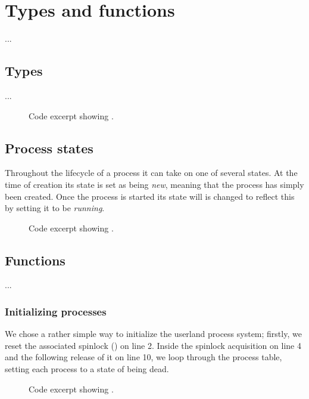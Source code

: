 %
%
%

\section{Types and functions}
...

\subsection{Types}
...
\begin{figure}[H]
    
    \label{code:process_control_block_t}
    \caption{Code excerpt showing .}
\end{figure}

\subsection{Process states}
Throughout the lifecycle of a process it can take on one of several states.
At the time of creation  its state is set
as being {\it new}, meaning that the process has simply been created. Once the
process is started  its state will is changed to
reflect this by setting it to be {\it running}.
\begin{figure}[H]
    
    \label{code:process_state_t}
    \caption{Code excerpt showing .}
\end{figure}

\newpage
\subsection{Functions}
...

\subsubsection{Initializing processes}
We chose a rather simple way to initialize the userland process system;
firstly, we reset the associated spinlock () on
line 2. Inside the spinlock acquisition on line 4 and the following release
of it on line 10, we loop through the process table, setting each process to
a state of being dead.

\begin{figure}[H]
    
    \label{code:process_init}
    \caption{Code excerpt showing .}
\end{figure}

